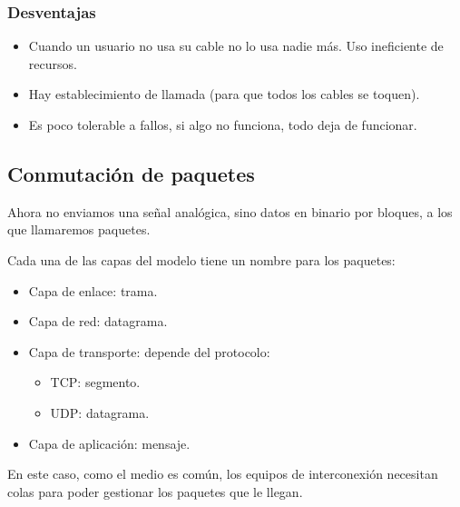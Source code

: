\subsubsection{Desventajas}
\begin{itemize}
    \item Cuando un usuario no usa su cable no lo usa nadie más. Uso ineficiente de recursos.
    \item Hay establecimiento de llamada (para que todos los cables se toquen).
    \item Es poco tolerable a fallos, si algo no funciona, todo deja de funcionar.
\end{itemize}

\subsection{Conmutación de paquetes}
Ahora no enviamos una señal analógica, sino datos en binario por bloques, a los que llamaremos paquetes. 

\begin{observacion}
    Cada una de las capas del modelo tiene un nombre para los paquetes:
    \begin{itemize}
        \item Capa de enlace: trama.
        \item Capa de red: datagrama.
        \item Capa de transporte: depende del protocolo:
            \begin{itemize}
                \item \acrshort{TCP}\@: segmento.
                \item \acrshort{UDP}\@: datagrama.
            \end{itemize}
        \item Capa de aplicación: mensaje. 
    \end{itemize}
\end{observacion}

En este caso, como el medio es común, los equipos de interconexión necesitan colas para poder gestionar los paquetes que le llegan. 

